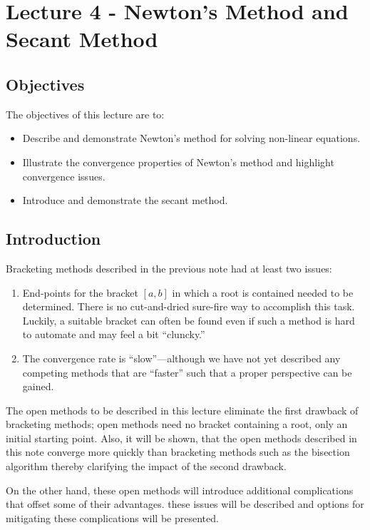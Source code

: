 \chapter{Lecture 4 - Newton's Method and Secant Method}
\label{ch:lec4n}
\section{Objectives}
The objectives of this lecture are to:
\begin{itemize}
\item Describe and demonstrate Newton's method for solving non-linear equations.
\item Illustrate the convergence properties of Newton's method and highlight convergence issues.
\item Introduce and demonstrate the secant method.
\end{itemize}
\setcounter{lstannotation}{0}

\section{Introduction}
Bracketing methods described in the previous note had at least two issues:
\begin{enumerate}
\item End-points for the bracket $\left[a,b\right]$ in which a root is contained needed to be determined.  There is no cut-and-dried sure-fire way to accomplish this task.  Luckily, a suitable bracket can often be found even if such a method is hard to automate and may feel a bit ``cluncky.''

\item The convergence rate is ``slow''---although we have not yet described any competing methods that are ``faster'' such that a proper perspective can be gained.
\end{enumerate}
The open methods to be described in this lecture eliminate the first drawback of bracketing methods; open methods need no bracket containing a root, only an initial starting point.  Also, it will be shown, that the open methods described in this note converge more quickly than bracketing methods such as the bisection algorithm thereby clarifying the impact of the second drawback. 

On the other hand, these open methods will introduce additional complications that offset some of their advantages.  these issues will be described and options for mitigating these complications will be presented.

